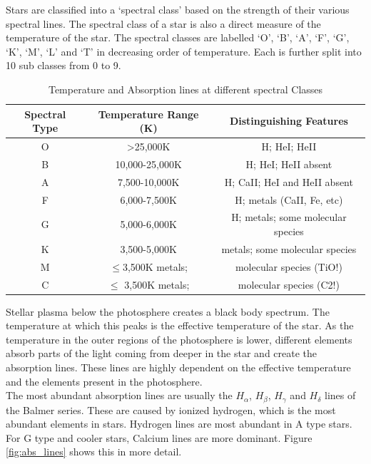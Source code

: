 \documentclass[12pt,a4paper]{article}
\begin{document}
    Stars are classified into a `spectral class' based on the strength of their various spectral lines. The spectral class of a star is also a direct measure of the temperature of the star. The spectral classes are labelled
    `O', `B', `A', `F', `G', `K', `M', `L' and `T' in decreasing order of temperature. Each is further split into 10 sub classes from 0 to 9. \\
    \begin{table}[H]
      \begin{tabular}{||c|c|c||}
        \hline
        Spectral Type & Temperature Range (K) & Distinguishing Features\\
        \hline
        \hline
        O	& \textgreater 25,000K	&H; HeI; HeII\\
        B	&10,000-25,000K	&H; HeI; HeII absent\\
        A	&7,500-10,000K	&H; CaII; HeI and HeII absent\\
        F	&6,000-7,500K	  &H; metals (CaII, Fe, etc)\\
        G	&5,000-6,000K  	&H; metals; some molecular species\\
        K	&3,500-5,000K	  &metals; some molecular species\\
        M	&$\leq $3,500K	metals;& molecular species (TiO!)\\
        C	&$\leq $ 3,500K	metals; &molecular species (C2!)\\
        \hline
      \end{tabular}
      \caption{Temperature and Absorption lines at different spectral Classes\cite{Spectral_Classification}}
    \end{table} 
    Stellar plasma below the photosphere creates a black body spectrum. The temperature at which this peaks is the effective temperature of the star. As the temperature in the outer regions of the photosphere is lower,
    different elements absorb parts of the light coming from deeper in the star and create the absorption lines. These lines are highly dependent on the effective temperature and the elements present in the photosphere.
    \\
    The most abundant absorption lines are usually the $H_\alpha$, $H_\beta$, $H_\gamma$ and $H_\delta$ lines of the Balmer series. These are caused by ionized hydrogen, which is the most abundant elements in stars.
    Hydrogen lines are most abundant in A type stars. For G type and cooler stars, Calcium lines are more dominant. Figure \ref{fig:abs_lines} shows this in more detail.
\end{document}
